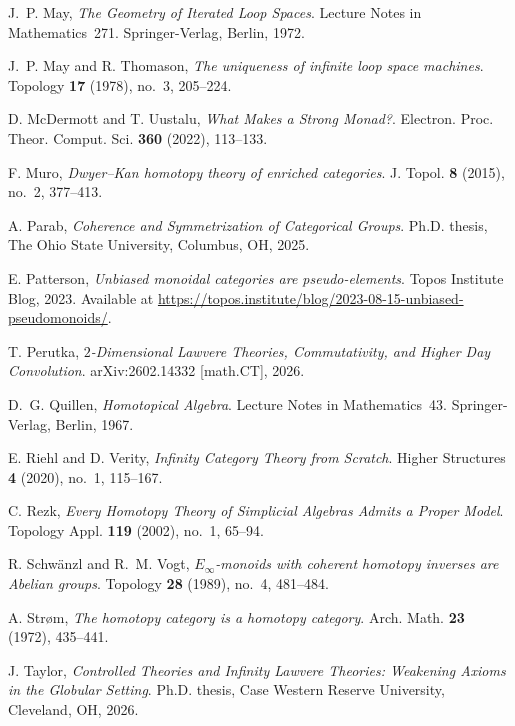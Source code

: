 \documentclass{tac}
\begin{document}
\begin{references*}
J.~P. May,
\emph{The Geometry of Iterated Loop Spaces}.
Lecture Notes in Mathematics~271.
Springer-Verlag, Berlin, 1972.

J.~P. May and R. Thomason,
\emph{The uniqueness of infinite loop space machines}.
Topology \textbf{17} (1978), no.~3, 205--224.

D. McDermott and T. Uustalu,
\emph{What Makes a Strong Monad?}.
Electron. Proc. Theor. Comput. Sci. \textbf{360} (2022), 113--133.

F. Muro,
\emph{Dwyer--Kan homotopy theory of enriched categories}.
J. Topol. \textbf{8} (2015), no.~2, 377--413.

A. Parab,
\emph{Coherence and Symmetrization of Categorical Groups}.
Ph.D. thesis, The Ohio State University, Columbus, OH, 2025.

E. Patterson,
\emph{Unbiased monoidal categories are pseudo-elements}.
Topos Institute Blog, 2023.
Available at \url{https://topos.institute/blog/2023-08-15-unbiased-pseudomonoids/}.

T. Perutka,
\emph{$2$-Dimensional Lawvere Theories, Commutativity, and Higher Day Convolution}.
arXiv:2602.14332 [math.CT], 2026.

D.~G. Quillen,
\emph{Homotopical Algebra}.
Lecture Notes in Mathematics~43.
Springer-Verlag, Berlin, 1967.

E. Riehl and D. Verity,
\emph{Infinity Category Theory from Scratch}.
Higher Structures \textbf{4} (2020), no.~1, 115--167.

C. Rezk,
\emph{Every Homotopy Theory of Simplicial Algebras Admits a Proper Model}.
Topology Appl. \textbf{119} (2002), no.~1, 65--94.

R. Schw\"anzl and R.~M. Vogt,
\emph{$E_\infty$-monoids with coherent homotopy inverses are Abelian groups}.
Topology \textbf{28} (1989), no.~4, 481--484.

A. Str{\o}m,
\emph{The homotopy category is a homotopy category}.
Arch. Math. \textbf{23} (1972), 435--441.

J. Taylor,
\emph{Controlled Theories and Infinity Lawvere Theories: Weakening Axioms in the Globular Setting}.
Ph.D. thesis, Case Western Reserve University, Cleveland, OH, 2026.


\end{references*}
\end{document}
